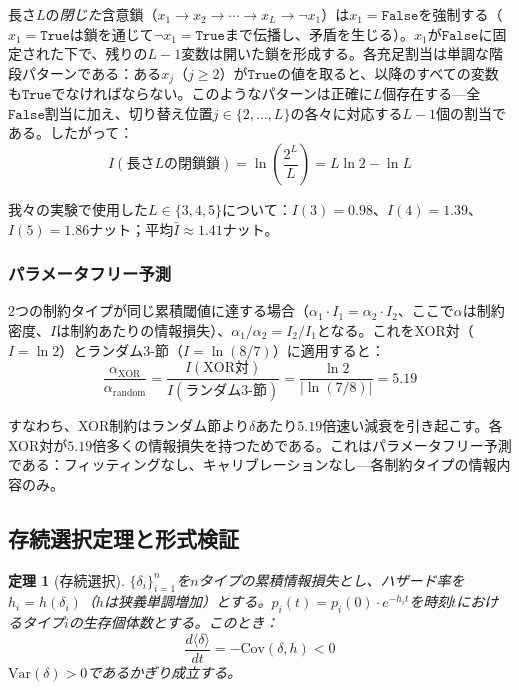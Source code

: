 \documentclass[11pt,a4paper]{article}
\newtheorem{theorem}{定理}
\begin{document}
長さ$L$の\emph{閉じた}含意鎖（$x_1 \to x_2 \to \cdots \to x_L \to \neg x_1$）は$x_1 = \mathtt{False}$を強制する（$x_1 = \mathtt{True}$は鎖を通じて$\neg x_1 = \mathtt{True}$まで伝播し、矛盾を生じる）。$x_1$が$\mathtt{False}$に固定された下で、残りの$L-1$変数は開いた鎖を形成する。各充足割当は単調な階段パターンである：ある$x_j$（$j \ge 2$）が$\mathtt{True}$の値を取ると、以降のすべての変数も$\mathtt{True}$でなければならない。このようなパターンは正確に$L$個存在する---全$\mathtt{False}$割当に加え、切り替え位置$j \in \{2, \ldots, L\}$の各々に対応する$L-1$個の割当である。したがって：
\begin{equation}
I(\text{長さ}L\text{の閉鎖鎖}) = \ln\!\left(\frac{2^L}{L}\right) = L \ln 2 - \ln L
\label{eq:delta-impl}
\end{equation}

我々の実験で使用した$L \in \{3, 4, 5\}$について：$I(3) = 0.98$、$I(4) = 1.39$、$I(5) = 1.86$ナット；平均$\bar{I} \approx 1.41$ナット。

\subsubsection{パラメータフリー予測}

2つの制約タイプが同じ累積閾値に達する場合（$\alpha_1 \cdot I_1 = \alpha_2 \cdot I_2$、ここで$\alpha$は制約密度、$I$は制約あたりの情報損失）、$\alpha_1 / \alpha_2 = I_2 / I_1$となる。これをXOR対（$I = \ln 2$）とランダム3-節（$I = \ln(8/7)$）に適用すると：
\begin{equation}
\frac{\alpha_{\text{XOR}}}{\alpha_{\text{random}}} = \frac{I(\text{XOR対})}{I(\text{ランダム3-節})} = \frac{\ln 2}{|\ln(7/8)|} = 5.19
\label{eq:ratio-prediction}
\end{equation}

すなわち、XOR制約はランダム節より$\delta$あたり$5.19$倍速い減衰を引き起こす。各XOR対が$5.19$倍多くの情報損失を持つためである。これはパラメータフリー予測である：フィッティングなし、キャリブレーションなし---各制約タイプの情報内容のみ。

\subsection{存続選択定理と形式検証}
\label{sec:h-theorem}

\begin{theorem}[存続選択]
\label{thm:h}
$\{\delta_i\}_{i=1}^{n}$を$n$タイプの累積情報損失とし、ハザード率を$h_i = h(\delta_i)$（$h$は狭義単調増加）とする。$p_i(t) = p_i(0) \cdot e^{-h_i t}$を時刻$t$におけるタイプ$i$の生存個体数とする。このとき：
\[
\frac{d\langle\delta\rangle}{dt} = -\mathrm{Cov}(\delta, h) < 0
\]
$\mathrm{Var}(\delta) > 0$であるかぎり成立する。
\end{theorem}
\end{document}
